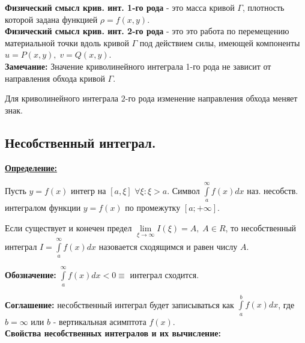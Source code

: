 \documentclass[a4paper,12pt]{article} %
\begin{document}
\textbf{Физический смысл крив. инт. 1-го рода} - это масса кривой $\Gamma$, плотность которой задана функцией $\rho = f(x,y)$.\\

\textbf{Физический смысл крив. инт. 2-го рода} - это это работа по перемещению материальной точки вдоль кривой $\Gamma$ под действием силы, имеющей компоненты $u=P(x,y),\; v=Q(x,y)$.\\

\textbf{Замечание:} Значение криволинейного интеграла 1-го рода не зависит от направления обхода кривой $\Gamma$.

Для криволинейного интеграла $2$-го рода изменение направления обхода меняет знак. \newpage

\subsection{Несобственный интеграл.}

\underline{\textbf{Определение:}} 

Пусть $y=f(x)$ интегр на $[a, \xi]$ $\forall \xi:\xi>a $. Символ $\int\limits_a^{\infty} f(x) dx   $ наз. несобств. интегралом функции $y=f(x)$ по промежутку $[a; +\infty]$.

Если существует и конечен предел $\lim\limits_{\xi \rightarrow \infty} I(\xi) = A, \; A\in R$, то несобственный интеграл $I=\int\limits_a^{\infty} f(x) dx$ назовается сходящимся и равен числу $A$.

\textbf{Обозначение:} $\int\limits_a^{\infty} f(x) dx < 0 \equiv$ интеграл сходится.

\textbf{Соглашение:} несобственный интеграл будет записываться как $\int\limits_a^{b} f(x) dx$, где $b = \infty$ или $b$ - вертикальная асимптота $f(x)$.\\

\textbf{Свойства несобственных интегралов и их вычисление:}
\end{document}
